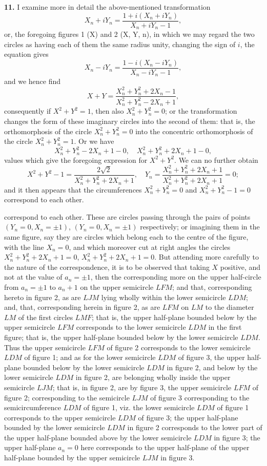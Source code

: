 \documentclass[11pt,a4paper]{book}
\begin{document}
\textbf{11.} I examine more in detail the above-mentioned transformation
\[
X_n + iY_n = \frac{1 + i(X_n + iY_n)}{X_n + iY_n - 1},
\]
or, the foregoing figures 1 (X) and 2 (X, Y, n), in which we may regard the two circles as having each of them the same radius unity, changing the sign of $i$, the equation gives
\[
X_n - iY_n = \frac{1 - i(X_n - iY_n)}{X_n - iY_n - 1},
\]
and we hence find
\[
X + Y = \frac{X_n^2 + Y_n^2 + 2X_n - 1}{X_n^2 + Y_n^2 - 2X_n + 1},
\]
consequently if $X^2 + Y^2 = 1$, then also $X_n^2 + Y_n^2 = 0$; or the transformation changes the form of these imaginary circles into the second of them: that is, the orthomorphosis of the circle $X_n^2 + Y_n^2 = 0$ into the concentric orthomorphosis of the circle $X_n^2 + Y_n^2 = 1$. Or we have
\[
X_n^2 + Y_n^2 - 2X_n + 1 - 0, \quad X_n^2 + Y_n^2 + 2X_n + 1 - 0,
\]
values which give the foregoing expression for $X^2 + Y^2$. We can no further obtain
\[
X^2 + Y^2 - 1 = \frac{2\sqrt{2}}{X_n^2 + Y_n^2 + 2X_n + 1}, \quad Y_n = \frac{X_n^2 + Y_n^2 + 2X_n + 1}{X_n^2 + Y_n^2 + 2X_n + 1} = 0;
\]
and it then appears that the circumferences $X_n^2 + Y_n^2 = 0$ and $X_n^2 + Y_n^2 - 1 = 0$ correspond to each other.

correspond to each other. These are circles passing through the pairs of points $(Y_n = 0, X_n = \pm 1)$, $(Y_n = 0, X_n = \pm 1)$ respectively; or imagining them in the same figure, say they are circles which belong each to the centre of the figure, with the line $X_n = 0$, and which moreover cut at right angles the circles $X_n^2 + Y_n^2 + 2X_n + 1 = 0$, $X_n^2 + Y_n^2 + 2X_n + 1 = 0$. But attending more carefully to the nature of the correspondence, it is to be observed that taking $X$ positive, and not at the value of $a_n = \pm 1$, then the corresponding more on the upper half-circle from $a_n = \pm 1$ to $a_n + 1$ on the upper semicircle $LFM$; and that, corresponding hereto in figure 2, as are $LJM$ lying wholly within the lower semicircle $LDM$; and, that, corresponding herein in figure 2, as are $LFM$ on $LM$ to the diameter $LM$ of the first circles $LMF$; that is, the upper half-plane bounded below by the upper semicircle $LFM$ corresponds to the lower semicircle $LDM$ in the first figure; that is, the upper half-plane bounded below by the lower semicircle $LDM$. Thus the upper semicircle $LFM$ of figure 2 corresponds to the lower semicircle $LDM$ of figure 1; and as for the lower semicircle $LDM$ of figure 3, the upper half-plane bounded below by the lower semicircle $LDM$ in figure 2, and below by the lower semicircle $LDM$ in figure 2, are belonging wholly inside the upper semicircle $LJM$; that is, in figure 2, are by figure 3, the upper semicircle $LFM$ of figure 2; corresponding to the semicircle $LJM$ of figure 3 corresponding to the semicircumference $LDM$ of figure 1, viz. the lower semicircle $LDM$ of figure 1 corresponds to the upper semicircle $LDM$ of figure 3; the upper half-plane bounded by the lower semicircle $LDM$ in figure 2 corresponds to the lower part of the upper half-plane bounded above by the lower semicircle $LDM$ in figure 3; the upper half-plane $a_n = 0$ here corresponds to the upper half-plane of the upper half-plane bounded by the upper semicircle $LJM$ in figure 3.
\end{document}
